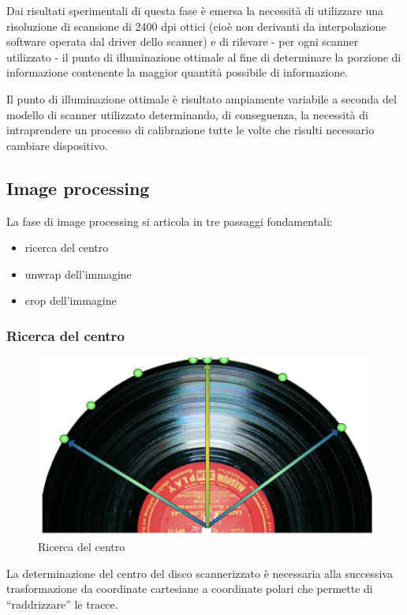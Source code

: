 Dai risultati sperimentali di questa fase \`e emersa la necessit\`a di utilizzare una risoluzione di scansione di 2400 dpi ottici (cio\`e non derivanti da interpolazione software operata dal driver dello scanner) e di rilevare - per ogni scanner utilizzato - il punto di illuminazione ottimale al fine di determinare la porzione di informazione contenente la maggior quantit\`a possibile di informazione.

Il punto di illuminazione ottimale \`e risultato ampiamente variabile a seconda del modello di scanner utilizzato determinando, di conseguenza, la necessit\`a di intraprendere un processo di calibrazione tutte le volte che risulti necessario cambiare dispositivo.

\subsection{Image processing}
La fase di image processing si articola in tre passaggi fondamentali:
\begin{itemize}
	\item ricerca del centro
	\item unwrap dell'immagine
	\item crop dell'immagine
\end{itemize}

\subsubsection{Ricerca del centro}
\begin{figure}[h!t]
\begin{center}
\includegraphics[scale=0.15]{./img/center.png}
\caption{Ricerca del centro}
\end{center}
\end{figure}
La determinazione del centro del disco scannerizzato \`e necessaria alla successiva trasformazione da coordinate cartesiane a coordinate polari che permette di ``raddrizzare'' le tracce.


